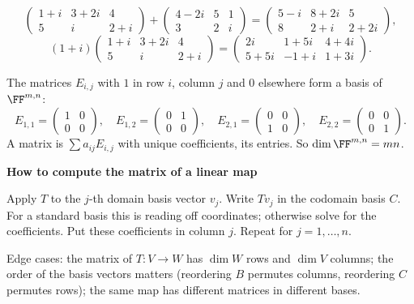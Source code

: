 \documentclass[10pt]{scrartcl}
\newenvironment{methodbox}[1]{\begin{mdframed}[style=methodstyle]\textbf{\color{NavyBlue}#1}\par\vspace{2pt}}{\end{mdframed}}
\begin{document}
\begin{example*}
  \[
    \begin{pmatrix}1+i&3+2i&4\\5&i&2+i\end{pmatrix}+\begin{pmatrix}4-2i&5&1\\3&2&i\end{pmatrix}=\begin{pmatrix}5-i&8+2i&5\\8&2+i&2+2i\end{pmatrix},
  \]
  \[
    (1+i)\begin{pmatrix}1+i&3+2i&4\\5&i&2+i\end{pmatrix}=\begin{pmatrix}2i&1+5i&4+4i\\5+5i&-1+i&1+3i\end{pmatrix}.
  \]
\end{example*}

\begin{example*}
  The matrices $E_{i,j}$ with $1$ in row $i$, column $j$ and $0$ elsewhere form a basis of $\FF^{m,n}$:
  \[
    E_{1,1}=\begin{pmatrix}1&0\\0&0\end{pmatrix},\quad E_{1,2}=\begin{pmatrix}0&1\\0&0\end{pmatrix},\quad E_{2,1}=\begin{pmatrix}0&0\\1&0\end{pmatrix},\quad E_{2,2}=\begin{pmatrix}0&0\\0&1\end{pmatrix}.
  \]
  A matrix is $\sum a_{ij}E_{i,j}$ with unique coefficients, its entries. So $\dim\FF^{m,n}=mn$.
\end{example*}

\begin{methodbox}{How to compute the matrix of a linear map}
  \begin{steps}
    \ii Apply $T$ to the $j$-th domain basis vector $v_j$.
    \ii Write $Tv_j$ in the codomain basis $C$. For a standard basis this is reading off coordinates; otherwise solve for the coefficients.
    \ii Put these coefficients in column $j$. Repeat for $j=1,\dots,n$.
  \end{steps}
  Edge cases: the matrix of $T\colon V\to W$ has $\dim W$ rows and $\dim V$ columns; the order of the basis vectors matters (reordering $B$ permutes columns, reordering $C$ permutes rows); the same map has different matrices in different bases.
\end{methodbox}
\end{document}
